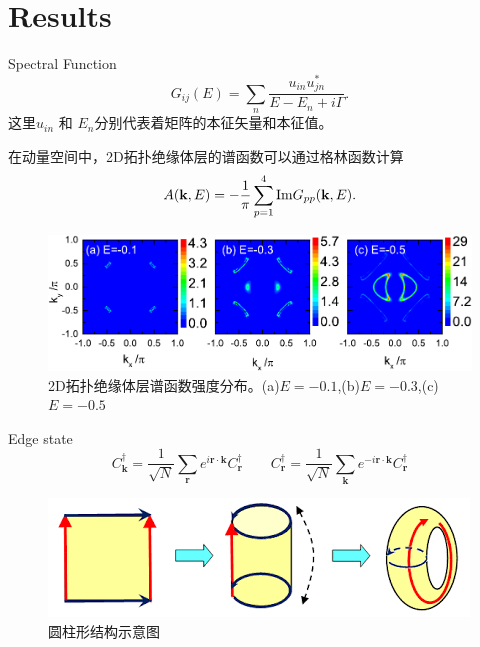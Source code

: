 \documentclass[10pt,aspectratio=169]{beamer} %
\begin{document}
\section{Results}
\begin{frame}{Spectral Function}
	\begin{equation}
	G_{ij}(E)=\sum_n\frac{u_{in}u^{*}_{jn}}{E-E_n+i\Gamma}.
	\end{equation}
	这里$u_{in}$ 和 $E_n$分别代表着矩阵的本征矢量和本征值。
	
	在动量空间中，2D拓扑绝缘体层的谱函数可以通过格林函数计算
	\begin{equation}
	A({\bf k},E)=-\frac{1}{\pi}\sum^4_{p=1}\mathrm{Im} G_{pp}({\bf k},E).
	\end{equation}
\begin{figure}[h]
	\centering
	\includegraphics[scale=0.5]{pic/fig17.pdf}
	\caption{2D拓扑绝缘体层谱函数强度分布。(a)$E=-0.1$,(b)$E=-0.3$,(c)$E=-0.5$}\label{fig16}
\end{figure}
\end{frame}
\begin{frame}{Edge state}
\begin{equation}
C^\dagger_\mathbf{k}=\frac{1}{\sqrt{N}}\sum_\mathbf{r}e^{i\mathbf{r}\cdot\mathbf{k}}C^\dagger_\mathbf{r}\qquad C^\dagger_\mathbf{r}=\frac{1}{\sqrt{N}}\sum_\mathbf{k}e^{-i\mathbf{r}\cdot\mathbf{k}}C^\dagger_\mathbf{r}
\end{equation}
\begin{figure}
\centering
\includegraphics[scale=0.6]{pic/fig16}
\caption{圆柱形结构示意图}\label{fig15}
\end{figure}
\end{frame}
\end{document}
